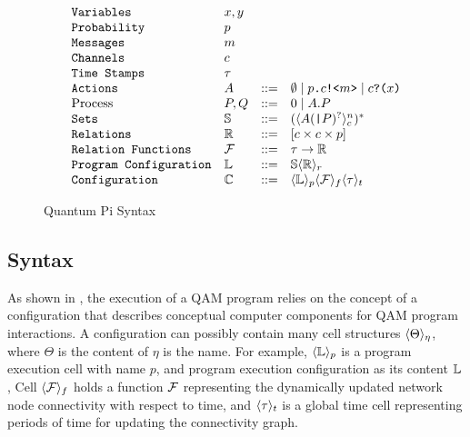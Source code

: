 \begin{figure}[t]
{\small
  \[\begin{array}{llcl} 
      \texttt{Variables} & x,y \\
      \texttt{Probability} & p\\
      \texttt{Messages} & m\\
    \texttt{Channels} & c\\
    \texttt{Time Stamps} & \tau\\
      \texttt{Actions} & A & ::= & \emptyset \mid p\texttt{.}c\texttt{!<}m\texttt{>} \mid c\texttt{?(}x\texttt{)} \\
      \text{Process} & P,Q & ::= & 0 \mid A.P \\
      \texttt{Sets} & \mathbb{S} & ::= & (\langle A (\texttt{|} P )^?\rangle^{n}_{c})^* \\
      \texttt{Relations} & \mathbb{R} & ::= & [c \times c \times p] \\
      \texttt{Relation Functions} & \mathcal{F} & ::= & \tau \to \mathbb{R}\\
      \texttt{Program Configuration} & \mathbb{L} & ::= & \mathbb{S} \langle \mathbb{R} \rangle_r\\
      \texttt{Configuration} & \mathbb{C} & ::= & \langle \mathbb{L} \rangle_{p}\langle \mathcal{F} \rangle_{f}\langle \tau \rangle_{t}
    \end{array}
  \]
}
\caption{Quantum Pi Syntax}
  \label{fig:q-pi-syntax}
\end{figure}


\subsection{Syntax} \label{sec:qamsyntax}

As shown in , the execution of a QAM program relies on the concept of 
a configuration that describes conceptual computer components for QAM program interactions.
A configuration can possibly contain many cell structures $\langle \Theta \rangle_{\eta}$, where $\Theta$ is the content of $\eta$ is the name.
For example, $\langle \mathbb{L} \rangle_{p}$ is a program execution cell with name $p$, and program execution configuration as its content $\mathbb{L}$,
Cell $\langle \mathcal{F} \rangle_{f}$ holds a function $\mathcal{F}$ representing the dynamically updated network node connectivity with respect to time, and $\langle \tau \rangle_{t}$ is a global time cell representing periods of time for updating the connectivity graph.

